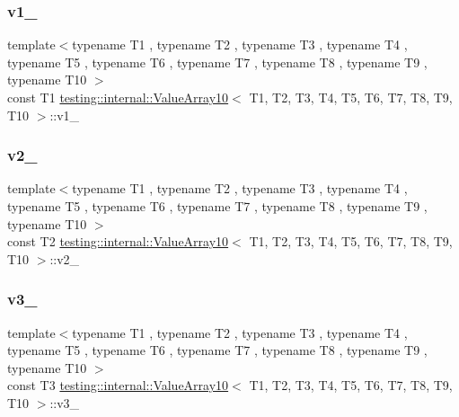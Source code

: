 \subsubsection{\texorpdfstring{v1\_}{v1\_}}
{\footnotesize\ttfamily template$<$typename T1 , typename T2 , typename T3 , typename T4 , typename T5 , typename T6 , typename T7 , typename T8 , typename T9 , typename T10 $>$ \\
const T1 \mbox{\hyperlink{classtesting_1_1internal_1_1_value_array10}{testing\+::internal\+::\+Value\+Array10}}$<$ T1, T2, T3, T4, T5, T6, T7, T8, T9, T10 $>$\+::v1\+\_\+\hspace{0.3cm}{\ttfamily [private]}}

\mbox{\label{classtesting_1_1internal_1_1_value_array10_a86bfcdb6e7535ada7bc8c0b7a5d6c55d}} 
\subsubsection{\texorpdfstring{v2\_}{v2\_}}
{\footnotesize\ttfamily template$<$typename T1 , typename T2 , typename T3 , typename T4 , typename T5 , typename T6 , typename T7 , typename T8 , typename T9 , typename T10 $>$ \\
const T2 \mbox{\hyperlink{classtesting_1_1internal_1_1_value_array10}{testing\+::internal\+::\+Value\+Array10}}$<$ T1, T2, T3, T4, T5, T6, T7, T8, T9, T10 $>$\+::v2\+\_\+\hspace{0.3cm}{\ttfamily [private]}}

\mbox{\label{classtesting_1_1internal_1_1_value_array10_aa0fab38b2fb8af588f6fc2e8a1e0637f}} 
\subsubsection{\texorpdfstring{v3\_}{v3\_}}
{\footnotesize\ttfamily template$<$typename T1 , typename T2 , typename T3 , typename T4 , typename T5 , typename T6 , typename T7 , typename T8 , typename T9 , typename T10 $>$ \\
const T3 \mbox{\hyperlink{classtesting_1_1internal_1_1_value_array10}{testing\+::internal\+::\+Value\+Array10}}$<$ T1, T2, T3, T4, T5, T6, T7, T8, T9, T10 $>$\+::v3\+\_\+\hspace{0.3cm}{\ttfamily [private]}}

